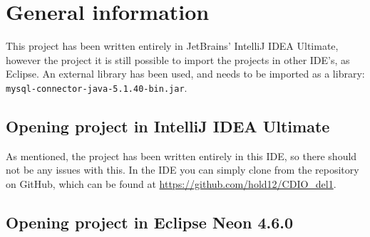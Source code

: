 \section{General information}

This project has been written entirely in JetBrains' IntelliJ IDEA Ultimate, however the project it is still possible to import the projects in other IDE's, as Eclipse.
An external library has been used, and needs to be imported as a library: \texttt{mysql-connector-java-5.1.40-bin.jar}.

\subsection{Opening project in IntelliJ IDEA Ultimate}

As mentioned, the project has been written entirely in this IDE, so there should not be any issues with this. In the IDE you can simply clone from the repository on GitHub, which can be found at \url{https://github.com/hold12/CDIO_del1}.

\subsection{Opening project in Eclipse Neon 4.6.0}

